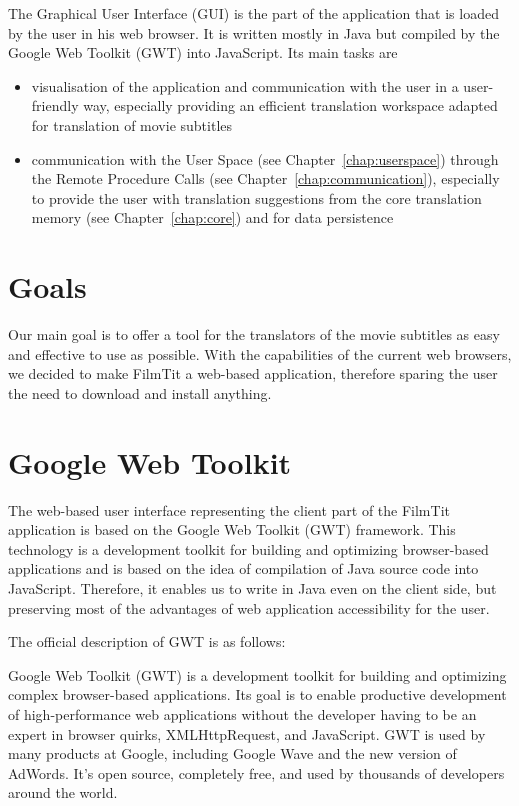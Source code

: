 
The Graphical User Interface (GUI) is the part of the application that is loaded by the user in his web browser. It is written mostly in Java but compiled by the Google Web Toolkit (GWT) into JavaScript. Its main tasks are

\begin{itemize}
\item visualisation of the application and communication with the user in a user-friendly way, especially providing an efficient translation workspace adapted for translation of movie subtitles
\item communication with the User Space (see Chapter~\ref{chap:userspace}) through the Remote Procedure Calls (see Chapter~\ref{chap:communication}), especially to provide the user with translation suggestions from the core translation memory (see Chapter~\ref{chap:core}) and for data persistence
\end{itemize}

\section{Goals}
Our main goal is to offer a tool for the translators of the movie subtitles as easy and effective to use as possible. With the capabilities of the current web browsers, we decided to make FilmTit a web-based application, therefore sparing the user the need to download and install anything.

\section{Google Web Toolkit}
The web-based user interface representing the client part of the FilmTit application is based on the Google Web Toolkit (GWT) framework. This technology is a development toolkit for building and optimizing browser-based applications %
and is based on the idea of compilation of Java source code into JavaScript. Therefore, it enables us to write in Java even on the client side, but preserving most of the advantages of web application accessibility for the user.

The official description of GWT is as follows:

Google Web Toolkit (GWT) is a development toolkit for building and optimizing complex browser-based applications. Its goal is to enable productive development of high-performance web applications without the developer having to be an expert in browser quirks, XMLHttpRequest, and JavaScript. GWT is used by many products at Google, including Google Wave and the new version of AdWords. It's open source, completely free, and used by thousands of developers around the world.


